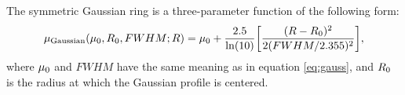 \documentclass[preprint2]{emulateapj}
\begin{document}
The symmetric Gaussian ring is a three-parameter function of the following form:
\begin{equation}
\mu_{\rm Gaussian}(\mu_{\rm 0},R_{\rm 0},FWHM;R) = \mu_{\rm 0} + \frac{2.5}{\ln(10)} 
\biggl[\frac{(R-R_{\rm 0})^2}{2(FWHM/2.355)^2} \biggr] ,
\end{equation}
where $\mu_{\rm 0}$ and $FWHM$ have the same meaning as in equation \ref{eq:gauss}, 
and $R_{\rm 0}$ is the radius at which the Gaussian profile is centered. \\






\clearpage
\end{document}
